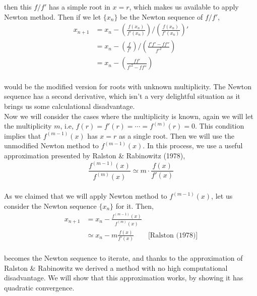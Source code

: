 \documentclass[paper=a4, fontsize=11pt]{scrartcl}
\begin{document}
then this $f/f'$ has a simple root in $x=r$, which makes us available to apply Newton method. Then if we let $\{x_n\}$ be the Newton sequence of $f/f'$,\\

\begin{equation}\nonumber
	\begin{split}
	x_{n+1}&=x_n - \left( \frac{f(x_n)}{f'(x_n)} \right) \Big/ \left( \frac{f(x_n)}{f'(x_n)}  \right)' \\[2.5ex]
	& = x_n - \left( \frac{f}{f'} \right) \Big/ \left( \frac{f'f' - f f''}{f'^2}  \right) \\[2.5ex]
	&= x_n - \left( \frac{ff'}{f'^2 - ff''} \right)
	\end{split}
\end{equation}\\

would be the modified version for roots with unknown multiplicity. The Newton sequence has a second derivative, which isn't a very delightful situation as it brings us some calculational disadvantage. \\

Now we will consider the cases where the multiplicity is known, again we will let the multiplicity $m$, i.e, $f(r)=f'(r)= \cdots = f^{(m)}(r)=0$. This condition implies that $f^{(m-1)}(x)$ has $x=r$ as a single root. Then we will use the unmodified Newton method to $f^{(m-1)}(x)$. In this process, we use a useful approximation presented by Ralston \& Rabinowitz (1978), \\

\begin{equation}\nonumber
	\frac{f^{(m-1)}(x)}{f^{(m)}(x)} \simeq m \cdot \frac{f(x)}{f'(x)}
\end{equation} \\

As we claimed that we will apply Newton method to $f^{(m-1)}(x)$, let us consider the Newton sequence $\{x_n\}$ for it. Then, \\

\begin{equation}\nonumber
	\begin{split}
	x_{n+1} &= x_n - \frac{f^{(m-1)}(x)}{f^{(m)}(x)} \\[2.5ex]
	&\simeq x_n - m \frac{f(x)}{f'(x)} \qquad \text{[Ralston (1978)]}
	\end{split}
\end{equation}\\

becomes the Newton sequence to iterate, and thanks to the approximation of Ralston \& Rabinowitz we derived a method with no high computational disadvantage. We will show that this approximation works, by showing it has quadratic convergence. \\
\end{document}
